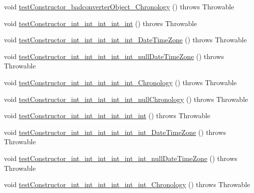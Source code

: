 \begin{DoxyCompactItemize}
\item 
void \hyperlink{classorg_1_1joda_1_1time_1_1_test_date_time___constructors_af05f4b673b490cce37739455d17d388d}{test\-Constructor\-\_\-badconverter\-Object\-\_\-\-Chronology} ()  throws Throwable 
\item 
void \hyperlink{classorg_1_1joda_1_1time_1_1_test_date_time___constructors_aaf1db592fed41371e53ca27b9bd1d262}{test\-Constructor\-\_\-int\-\_\-int\-\_\-int\-\_\-int\-\_\-int} ()  throws Throwable 
\item 
void \hyperlink{classorg_1_1joda_1_1time_1_1_test_date_time___constructors_ac7d739ef42936a925296b66d7f38c83c}{test\-Constructor\-\_\-int\-\_\-int\-\_\-int\-\_\-int\-\_\-int\-\_\-\-Date\-Time\-Zone} ()  throws Throwable 
\item 
void \hyperlink{classorg_1_1joda_1_1time_1_1_test_date_time___constructors_a88d02ddd7edc00302e8154f5f5257821}{test\-Constructor\-\_\-int\-\_\-int\-\_\-int\-\_\-int\-\_\-int\-\_\-null\-Date\-Time\-Zone} ()  throws Throwable 
\item 
void \hyperlink{classorg_1_1joda_1_1time_1_1_test_date_time___constructors_a9a608bedb1ae26fafe7f6b840f2bb638}{test\-Constructor\-\_\-int\-\_\-int\-\_\-int\-\_\-int\-\_\-int\-\_\-\-Chronology} ()  throws Throwable 
\item 
void \hyperlink{classorg_1_1joda_1_1time_1_1_test_date_time___constructors_a00046999f13a978ec5020a06d4545788}{test\-Constructor\-\_\-int\-\_\-int\-\_\-int\-\_\-int\-\_\-int\-\_\-null\-Chronology} ()  throws Throwable 
\item 
void \hyperlink{classorg_1_1joda_1_1time_1_1_test_date_time___constructors_a23cb5aa750429e0b51f8b5770c3bfbaf}{test\-Constructor\-\_\-int\-\_\-int\-\_\-int\-\_\-int\-\_\-int\-\_\-int} ()  throws Throwable 
\item 
void \hyperlink{classorg_1_1joda_1_1time_1_1_test_date_time___constructors_a8c4a40e071c6753c5526561fdc77f5d2}{test\-Constructor\-\_\-int\-\_\-int\-\_\-int\-\_\-int\-\_\-int\-\_\-int\-\_\-\-Date\-Time\-Zone} ()  throws Throwable 
\item 
void \hyperlink{classorg_1_1joda_1_1time_1_1_test_date_time___constructors_a3f63cb3458986f5a2f943689b53b9205}{test\-Constructor\-\_\-int\-\_\-int\-\_\-int\-\_\-int\-\_\-int\-\_\-int\-\_\-null\-Date\-Time\-Zone} ()  throws Throwable 
\item 
void \hyperlink{classorg_1_1joda_1_1time_1_1_test_date_time___constructors_acbaa25f1029409b66e4b8379469ad4d4}{test\-Constructor\-\_\-int\-\_\-int\-\_\-int\-\_\-int\-\_\-int\-\_\-int\-\_\-\-Chronology} ()  throws Throwable 

\end{DoxyCompactItemize}
